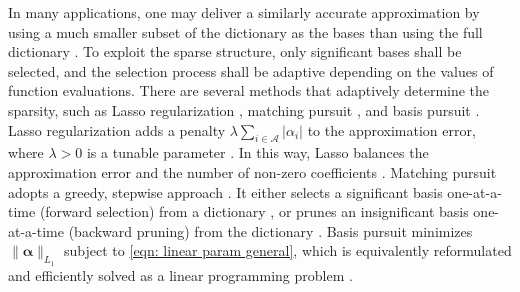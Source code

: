 In many applications, 
one may deliver a similarly accurate approximation by 
using a much smaller subset of the dictionary as the bases
than using the full dictionary \cite{PCE, L1 basis pursuit, match pursuit, Lasso variable selection}.
To exploit the sparse structure, only significant bases shall be selected, and
the selection process shall be adaptive depending on the values of function evaluations.
There are several methods that adaptively determine the sparsity, such as Lasso regularization
\cite{Lasso variable selection}, matching 
pursuit \cite{match pursuit}, and basis pursuit \cite{L1 basis pursuit}. 
Lasso regularization adds a penalty $\lambda
\sum_{i\in\mathcal{A}}|\alpha_i|$
to the approximation error, where $\lambda>0$ is a tunable parameter \cite{Lasso variable selection}. 
In this way, Lasso balances the approximation error and the number of non-zero
coefficients \cite{Lasso variable selection}.
Matching pursuit adopts a greedy, stepwise approach \cite{match pursuit}.
It either selects a significant basis one-at-a-time (forward selection) from a dictionary
\cite{forward selection},
or prunes an insignificant basis one-at-a-time (backward pruning) from the dictionary
\cite{backward prune}. 
Basis pursuit minimizes $\|\boldsymbol{\alpha}\|_{L_1}$ subject to \eqref{eqn: linear param general},
which is equivalently reformulated and efficiently solved as a linear programming problem 
\cite{L1 basis pursuit}.\\

